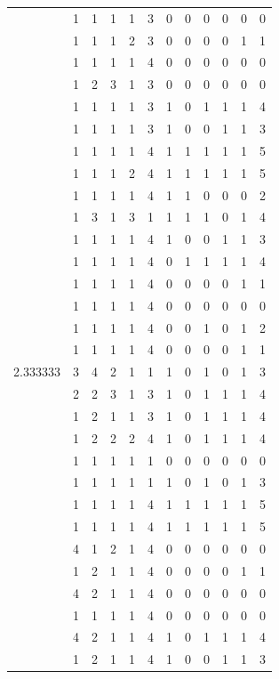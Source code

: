 \documentclass[]{book}
\theoremstyle{definition}
\theoremstyle{definition}
\theoremstyle{definition}
\theoremstyle{remark}
\begin{document}
\begin{table}
{\begin{tabular}[t]{rrrrrrrrrrrr}
 & 1 & 1 & 1 & 1 & 3 & 0 & 0 & 0 & 0 & 0 & 0\\
 & 1 & 1 & 1 & 2 & 3 & 0 & 0 & 0 & 0 & 1 & 1\\
 & 1 & 1 & 1 & 1 & 4 & 0 & 0 & 0 & 0 & 0 & 0\\
 & 1 & 2 & 3 & 1 & 3 & 0 & 0 & 0 & 0 & 0 & 0\\
 & 1 & 1 & 1 & 1 & 3 & 1 & 0 & 1 & 1 & 1 & 4\\
 & 1 & 1 & 1 & 1 & 3 & 1 & 0 & 0 & 1 & 1 & 3\\
 & 1 & 1 & 1 & 1 & 4 & 1 & 1 & 1 & 1 & 1 & 5\\
 & 1 & 1 & 1 & 2 & 4 & 1 & 1 & 1 & 1 & 1 & 5\\
 & 1 & 1 & 1 & 1 & 4 & 1 & 1 & 0 & 0 & 0 & 2\\
 & 1 & 3 & 1 & 3 & 1 & 1 & 1 & 1 & 0 & 1 & 4\\
 & 1 & 1 & 1 & 1 & 4 & 1 & 0 & 0 & 1 & 1 & 3\\
 & 1 & 1 & 1 & 1 & 4 & 0 & 1 & 1 & 1 & 1 & 4\\
 & 1 & 1 & 1 & 1 & 4 & 0 & 0 & 0 & 0 & 1 & 1\\
 & 1 & 1 & 1 & 1 & 4 & 0 & 0 & 0 & 0 & 0 & 0\\
 & 1 & 1 & 1 & 1 & 4 & 0 & 0 & 1 & 0 & 1 & 2\\
 & 1 & 1 & 1 & 1 & 4 & 0 & 0 & 0 & 0 & 1 & 1\\
2.333333 & 3 & 4 & 2 & 1 & 1 & 1 & 0 & 1 & 0 & 1 & 3\\
 & 2 & 2 & 3 & 1 & 3 & 1 & 0 & 1 & 1 & 1 & 4\\
 & 1 & 2 & 1 & 1 & 3 & 1 & 0 & 1 & 1 & 1 & 4\\
 & 1 & 2 & 2 & 2 & 4 & 1 & 0 & 1 & 1 & 1 & 4\\
 & 1 & 1 & 1 & 1 & 1 & 0 & 0 & 0 & 0 & 0 & 0\\
 & 1 & 1 & 1 & 1 & 1 & 1 & 0 & 1 & 0 & 1 & 3\\
 & 1 & 1 & 1 & 1 & 4 & 1 & 1 & 1 & 1 & 1 & 5\\
 & 1 & 1 & 1 & 1 & 4 & 1 & 1 & 1 & 1 & 1 & 5\\
 & 4 & 1 & 2 & 1 & 4 & 0 & 0 & 0 & 0 & 0 & 0\\
 & 1 & 2 & 1 & 1 & 4 & 0 & 0 & 0 & 0 & 1 & 1\\
 & 4 & 2 & 1 & 1 & 4 & 0 & 0 & 0 & 0 & 0 & 0\\
 & 1 & 1 & 1 & 1 & 4 & 0 & 0 & 0 & 0 & 0 & 0\\
 & 4 & 2 & 1 & 1 & 4 & 1 & 0 & 1 & 1 & 1 & 4\\
 & 1 & 2 & 1 & 1 & 4 & 1 & 0 & 0 & 1 & 1 & 3\\

\end{tabular}}
\end{table}
\end{document}
